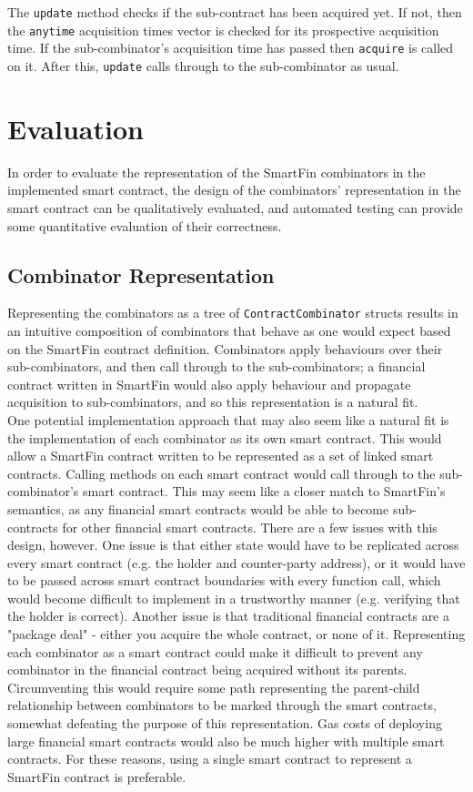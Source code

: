 The \texttt{update} method checks if the sub-contract has been acquired yet. If not, then the \texttt{anytime} acquisition times vector is checked for its prospective acquisition time. If the sub-combinator's acquisition time has passed then \texttt{acquire} is called on it. After this, \texttt{update} calls through to the sub-combinator as usual.


\section{Evaluation} \label{combinators-eval}

In order to evaluate the representation of the SmartFin combinators in the implemented smart contract, the design of the combinators' representation in the smart contract can be qualitatively evaluated, and automated testing can provide some quantitative evaluation of their correctness.


\subsection{Combinator Representation}

Representing the combinators as a tree of \texttt{ContractCombinator} structs results in an intuitive composition of combinators that behave as one would expect based on the SmartFin contract definition. Combinators apply behaviours over their sub-combinators, and then call through to the sub-combinators; a financial contract written in SmartFin would also apply behaviour and propagate acquisition to sub-combinators, and so this representation is a natural fit. \\

One potential implementation approach that may also seem like a natural fit is the implementation of each combinator as its own smart contract. This would allow a SmartFin contract written to be represented as a set of linked smart contracts. Calling methods on each smart contract would call through to the sub-combinator's smart contract. This may seem like a closer match to SmartFin's semantics, as any financial smart contracts would be able to become sub-contracts for other financial smart contracts. There are a few issues with this design, however. One issue is that either state would have to be replicated across every smart contract (e.g. the holder and counter-party address), or it would have to be passed across smart contract boundaries with every function call, which would become difficult to implement in a trustworthy manner (e.g. verifying that the holder is correct). Another issue is that traditional financial contracts are a "package deal" - either you acquire the whole contract, or none of it. Representing each combinator as a smart contract could make it difficult to prevent any combinator in the financial contract being acquired without its parents. Circumventing this would require some path representing the parent-child relationship between combinators to be marked through the smart contracts, somewhat defeating the purpose of this representation. Gas costs of deploying large financial smart contracts would also be much higher with multiple smart contracts. For these reasons, using a single smart contract to represent a SmartFin contract is preferable.


